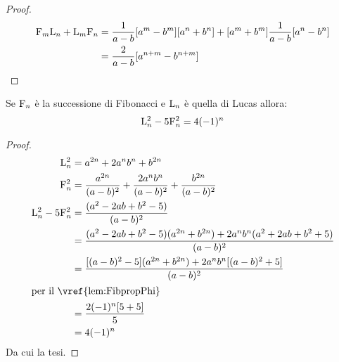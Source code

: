 \begin{proof}
	\begin{align*}
	\mathrm{F}_{m}\mathrm{L}_{n}+\mathrm{L}_{m}\mathrm{F}_{n}={}&\dfrac{1}{a-b}[a^m-b^m][a^n+b^n]+[a^m+b^m]\dfrac{1}{a-b}[a^n-b^n]\\
	={}&\dfrac{2}{a-b}[a^{n+m}-b^{n+m}]
	\end{align*}
\end{proof}
\begin{thm}
	Se $\mathrm{F}_{n}$ è la successione di Fibonacci e  $\mathrm{L}_{n}$ è quella di Lucas allora:
	\begin{equation}
		\mathrm{L}_{n}^2-5\mathrm{F}_{n}^2=4(-1)^{n}
	\end{equation}\label{eqn:FibLucFondamentale}
\end{thm}\cite{Rabinowitz_1996}
\begin{proof}
\begin{align*}
	\Luc{n}^2={}&a^{2n}+2a^nb^n+b^{2n}\\
	\Fib{n}^2={}&\dfrac{a^{2n}}{(a-b)^2}+\dfrac{2a^{n}b^{n}}{(a-b)^2}+\dfrac{b^{2n}}{(a-b)^2}\\
	\Luc{n}^2-5\Fib{n}^2={}&\dfrac{(a^2-2ab+b^2-5)}{(a-b)^2}\\
	={}&\dfrac{(a^2-2ab+b^2-5)(a^{2n}+b^{2n})+2a^nb^n(a^2+2ab+b^2+5)}{(a-b)^2}\\
	={}&\dfrac{[(a-b)^2-5](a^{2n}+b^{2n})+2a^nb^n[(a-b)^2+5]}{(a-b)^2}\\
	\intertext{per il~\vref{lem:FibpropPhi}}
	={}&\dfrac{2(-1)^n[5+5]}{5}\\
	={}&4(-1)^n\\
\end{align*}
Da cui la tesi.
\end{proof}